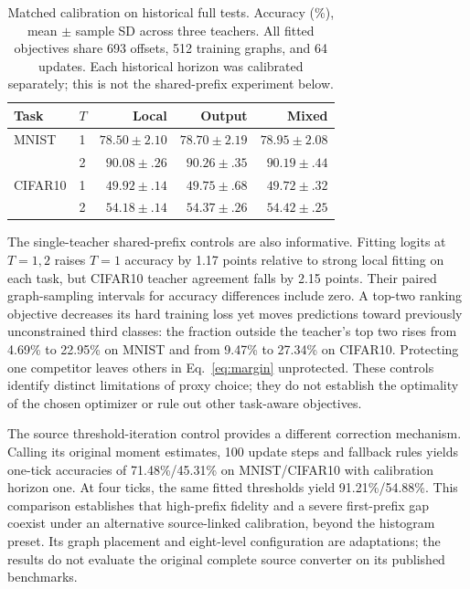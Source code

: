 \documentclass[10pt,twocolumn,letterpaper]{article}
\begin{document}
\begin{table}[t]
\caption{Matched calibration on historical full tests. Accuracy (\%), mean $\pm$ sample SD across three teachers. All fitted objectives share 693 offsets, 512 training graphs, and 64 updates. Each historical horizon was calibrated separately; this is not the shared-prefix experiment below.}
\label{tab:calibration}
\centering\small\setlength{\tabcolsep}{3pt}
\begin{tabular}{llrrr}\toprule
Task & $T$ & Local & Output & Mixed\\\midrule
MNIST & 1 & $78.50\pm2.10$ & $78.70\pm2.19$ & $78.95\pm2.08$\\
 & 2 & $90.08\pm.26$ & $90.26\pm.35$ & $90.19\pm.44$\\
CIFAR10 & 1 & $49.92\pm.14$ & $49.75\pm.68$ & $49.72\pm.32$\\
 & 2 & $54.18\pm.14$ & $54.37\pm.26$ & $54.42\pm.25$\\\bottomrule
\end{tabular}
\end{table}

The single-teacher shared-prefix controls are also informative. Fitting logits at $T=1,2$ raises $T=1$ accuracy by 1.17 points relative to strong local fitting on each task, but CIFAR10 teacher agreement falls by 2.15 points. Their paired graph-sampling intervals for accuracy differences include zero. A top-two ranking objective decreases its hard training loss yet moves predictions toward previously unconstrained third classes: the fraction outside the teacher's top two rises from 4.69\% to 22.95\% on MNIST and from 9.47\% to 27.34\% on CIFAR10. Protecting one competitor leaves others in Eq.~\eqref{eq:margin} unprotected. These controls identify distinct limitations of proxy choice; they do not establish the optimality of the chosen optimizer or rule out other task-aware objectives.

The source threshold-iteration control provides a different correction mechanism. Calling its original moment estimates, 100 update steps and fallback rules yields one-tick accuracies of 71.48\%/45.31\% on MNIST/CIFAR10 with calibration horizon one. At four ticks, the same fitted thresholds yield 91.21\%/54.88\%. This comparison establishes that high-prefix fidelity and a severe first-prefix gap coexist under an alternative source-linked calibration, beyond the histogram preset. Its graph placement and eight-level configuration are adaptations; the results do not evaluate the original complete source converter on its published benchmarks.
\end{document}
